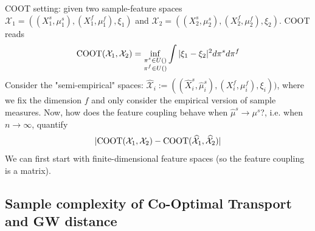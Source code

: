 COOT setting: given two sample-feature spaces
$\mathcal X_1 = ((X_1^s, \mu_1^s), (X_1^f, \mu_1^f), \xi_1)$ and
$\mathcal X_2 = ((X_2^s, \mu_2^s), (X_2^f, \mu_2^f), \xi_2)$. COOT reads
\begin{equation*}
    \text{COOT}(\mathcal X_1, \mathcal X_2) =
    \inf_{\substack{\pi^s \in U() \\ \pi^f \in U()}}
    \int |\xi_1 - \xi_2|^2 d\pi^s d\pi^f
\end{equation*}
Consider the "semi-empirical" spaces:
$\widehat{\mathcal X}_i := ((\widehat{X}_i^s, \widehat{\mu}_i^s), (X_i^f, \mu_i^f), \xi_i))$, where
we fix the dimension $f$ and only consider the empirical version of sample measures.
Now, how does the feature coupling behave when $\widehat{\mu}^s \to \mu^s$?, i.e. when $n \to \infty$,
quantify
\begin{equation}
    | \text{COOT}(\mathcal X_1, \mathcal X_2) -
    \text{COOT}(\widehat{\mathcal X}_1, \widehat{\mathcal X}_2) |
\end{equation}
We can first start with finite-dimensional feature spaces (so the feature coupling is a matrix).

\subsection{Sample complexity of Co-Optimal Transport and GW distance}
